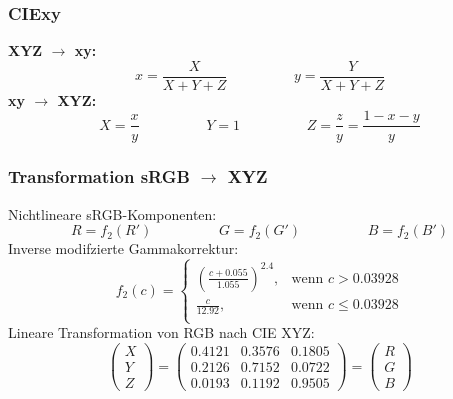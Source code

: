 \documentclass[10pt]{article}
\begin{document}
\subsubsection{CIExy}
\textbf{XYZ $\rightarrow$ xy:}
\begin{equation*}
	x= \frac{X}{X+Y+Z} \hspace{2cm} y= \frac{Y}{X+Y+Z}
\end{equation*}
\textbf{xy $\rightarrow$ XYZ:}
\begin{equation*}
	X=\frac{x}{y}\hspace{2cm} Y=1 \hspace{2cm} Z = \frac{z}{y} = \frac{1-x-y}{y}
\end{equation*}
\subsubsection{Transformation sRGB $\rightarrow$ XYZ}
Nichtlineare sRGB-Komponenten: 
\begin{equation*}
	R = f_2(R') \hspace{2cm} G = f_2(G') \hspace{2cm} B = f_2(B')
\end{equation*}
Inverse modifzierte Gammakorrektur:
\begin{equation*}
	f_2(c) = \begin{cases}
		\left( \frac{c + 0.055}{1.055} \right)^{2.4}, & \text{wenn } c > 0.03928 \\
		\frac{c}{12.92}, & \text{wenn } c \leq 0.03928 \\
	\end{cases}
\end{equation*}
Lineare Transformation von RGB nach CIE XYZ:
\begin{equation*}
	\begin{pmatrix} X \\ Y \\ Z \end{pmatrix} = \begin{pmatrix} 0.4121 & 0.3576 & 0.1805 \\0.2126 & 0.7152 & 0.0722 \\ 0.0193 & 0.1192 & 0.9505\end{pmatrix} =\begin{pmatrix} R \\ G \\ B \end{pmatrix}
\end{equation*}
\end{document}
